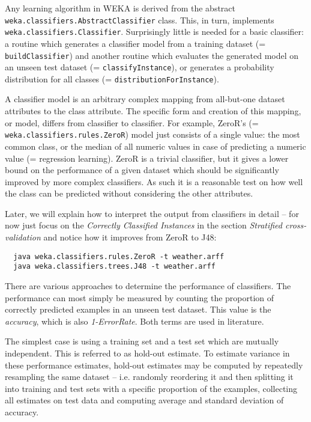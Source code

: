 Any learning algorithm in WEKA is derived from the abstract
\texttt{weka.classifiers.AbstractClassifier} class. This, in turn,
implements \texttt{weka.classifiers.Classifier}. Surprisingly little
is needed for a basic classifier: a routine which generates a
classifier model from a training dataset (= \texttt{buildClassifier})
and another routine which evaluates the generated model on an unseen
test dataset (= \texttt{classifyInstance}), or generates a probability
distribution for all classes (= \texttt{distributionForInstance}).

A classifier model is an arbitrary complex mapping from all-but-one dataset attributes to the class attribute. The specific form and creation of this mapping, or model, differs from classifier to classifier. For example, ZeroR's (= \texttt{weka.classifiers.rules.ZeroR}) model just consists of a single value: the most common class, or the median of all numeric values in case of predicting a numeric value (= regression learning). ZeroR is a trivial classifier, but it gives a lower bound on the performance of a given dataset which should be significantly improved by more complex classifiers. As such it is a reasonable test on how well the class can be predicted without considering the other attributes.

Later, we will explain how to interpret the output from classifiers in detail -- for now just focus on the \textit{Correctly Classified Instances} in the section \textit{Stratified cross-validation} and notice how it improves from ZeroR to J48:

{\scriptsize
\begin{verbatim}
  java weka.classifiers.rules.ZeroR -t weather.arff
  java weka.classifiers.trees.J48 -t weather.arff
\end{verbatim}}

\noindent There are various approaches to determine the performance of classifiers. The performance can most simply be measured by counting the proportion of correctly predicted examples in an unseen test dataset. This value is the \textit{accuracy}, which is also \textit{1-ErrorRate}. Both terms are used in literature.

The simplest case is using a training set and a test set which are mutually independent. This is referred to as hold-out estimate. To estimate variance in these performance estimates, hold-out estimates may be computed by repeatedly resampling the same dataset -- i.e. randomly reordering it and then splitting it into training and test sets with a specific proportion of the examples, collecting all estimates on test data and computing average and standard deviation of accuracy.

